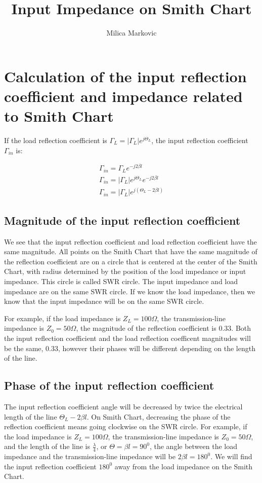 \documentclass{ximera}
\title{Input Impedance on Smith Chart}
\author{Milica Markovic}
\begin{document}
  
\begin{abstract}  

\end{abstract}  
\maketitle    






\section{Calculation of the input reflection coefficient and impedance related to Smith Chart}


If the load reflection coefficient is $\Gamma_L=|\Gamma_L| e^{j \Theta_{L}}$, 
the input reflection coefficient $\Gamma_{in}$ is: 

\begin{eqnarray}
\Gamma_{in}=\Gamma_L e^{-j2 \beta l} \\
\Gamma_{in} = |\Gamma_L| e^{j \Theta_{L}} e^{-j2 \beta l} \\
\Gamma_{in} = |\Gamma_L| e^{j(\Theta_{L} -2 \beta l) } 
\end{eqnarray}

\subsection{Magnitude of the input reflection coefficient}
We see that the input reflection coefficient and load reflection coefficient have the same magnitude. All points on the Smith Chart that have the same magnitude of the reflection coefficient are on a circle that is centered at the center of the Smith Chart, with radius determined by the position of the load impedance or input impedance. This circle is called SWR circle. The input impedance and load impedance are on the same SWR circle. If we know the load impedance, then we know that the input impedance will be on the same SWR circle.

For example, if the load impedance is $Z_L=100\Omega$, the transmission-line impedance is $Z_0=50\Omega$, the magnitude of the reflection coefficient is 0.33. Both the input reflection coefficient and the load reflection coefficent magnitudes will be the same, 0.33, however their phases will be different depending on the length of the line.

\subsection{Phase of the input reflection coefficient}
The input reflection coefficient angle will be decreased by twice the electrical length of the line $\Theta_{L} -2 \beta l$. On Smith Chart, decreasing the phase of the reflection coefficient means going clockwise on the SWR circle. For example, if the load impedance is $Z_L=100\Omega$, the transmission-line impedance is $Z_0=50\Omega$, and the length of the line is $\frac{\lambda}{4}$, or $\Theta=\beta l= 90^0$, the angle between the load impedance and the transmission-line impedance will be $2 \beta l = 180^0$. We will find the input reflection coefficient $180^0$ away from the load impedance on the Smith Chart.
\end{document}
